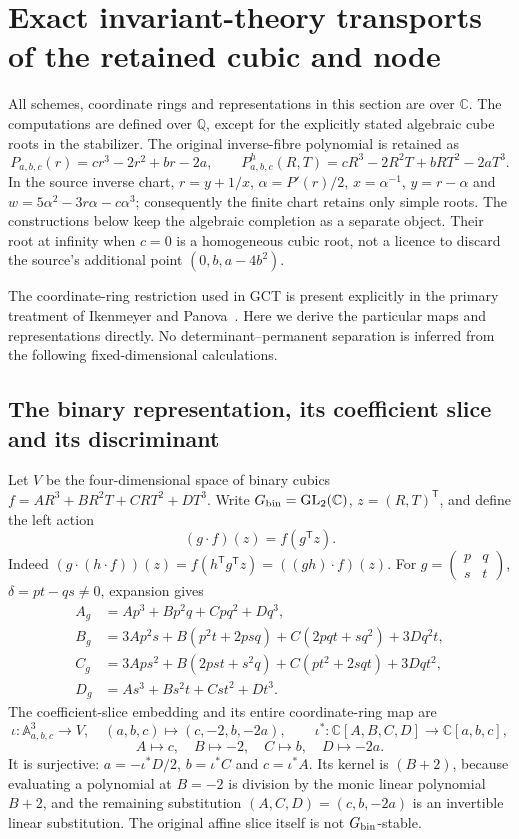 \section{Exact invariant-theory transports of the retained cubic and node}
\label{sec:gct-invariant-transport}

All schemes, coordinate rings and representations in this section are over
$\mathbb C$. The computations are defined over $\mathbb Q$, except for the
explicitly stated algebraic cube roots in the stabilizer. The original
inverse-fibre polynomial is retained as
\[
 P_{a,b,c}(r)=cr^3-2r^2+br-2a,
 \qquad P^h_{a,b,c}(R,T)=cR^3-2R^2T+bRT^2-2aT^3.
\]
In the source inverse chart, $r=y+1/x$, $\alpha=P'(r)/2$,
$x=\alpha^{-1}$, $y=r-\alpha$ and
$w=5\alpha^2-3r\alpha-c\alpha^3$; consequently the finite chart retains
only simple roots. The constructions below keep the algebraic completion
as a separate object. Their root at infinity when $c=0$ is a homogeneous
cubic root, not a licence to discard the source's additional point
$(0,b,a-4b^2)$.

The coordinate-ring restriction used in GCT is present explicitly in the
primary treatment of Ikenmeyer and Panova~\cite[Sections~1(a) and~2(b)]
{invariantIkenmeyerPanova}. Here we derive the particular
maps and representations directly. No determinant--permanent separation
is inferred from the following fixed-dimensional calculations.

\subsection{The binary representation, its coefficient slice and its discriminant}

Let $V$ be the four-dimensional space of binary cubics
$f=A R^3+B R^2T+C RT^2+D T^3$. Write $G_{\rm bin}=\operatorname{GL}_2(\mathbb C)$,
$z=(R,T)^{\mathsf T}$, and define the left action
\[
 (g\cdot f)(z)=f(g^{\mathsf T}z).
\]
Indeed $(g\cdot(h\cdot f))(z)=f(h^{\mathsf T}g^{\mathsf T}z)
=((gh)\cdot f)(z)$. For
$g=\left(\begin{smallmatrix}p&q\\s&t\end{smallmatrix}\right)$,
$\delta=pt-qs\ne0$, expansion gives
\begin{align*}
 A_g&=Ap^3+Bp^2q+Cpq^2+Dq^3,\\
 B_g&=3Ap^2s+B(p^2t+2psq)+C(2pqt+sq^2)+3Dq^2t,\\
 C_g&=3Aps^2+B(2pst+s^2q)+C(pt^2+2sqt)+3Dqt^2,\\
 D_g&=As^3+Bs^2t+Cst^2+Dt^3.
\end{align*}
The coefficient-slice embedding and its entire coordinate-ring map are
\[
 \iota:\mathbb A^3_{a,b,c}\longrightarrow V,
 \quad(a,b,c)\longmapsto(c,-2,b,-2a),
 \qquad
 \iota^*:\mathbb C[A,B,C,D]\longrightarrow\mathbb C[a,b,c],
\]
\[
 A\longmapsto c,\quad B\longmapsto-2,\quad C\longmapsto b,
 \quad D\longmapsto-2a.
\]
It is surjective: $a=-\iota^*D/2$, $b=\iota^*C$ and $c=\iota^*A$.
Its kernel is $(B+2)$, because evaluating a polynomial at $B=-2$
is division by the monic linear polynomial $B+2$, and the remaining
substitution $(A,C,D)=(c,b,-2a)$ is an invertible linear substitution.
The original affine slice itself is not $G_{\rm bin}$-stable.


